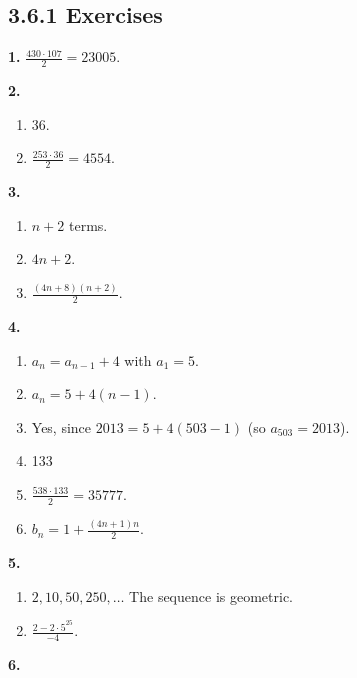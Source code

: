 \documentclass[10pt,]{book}
\theoremstyle{plain}
\theoremstyle{definition}
\theoremstyle{definition}
\theoremstyle{definition}
\numberwithin{equation}{chapter}
\begin{document}
\subsection*{3.6.1 Exercises}
\noindent\textbf{1.}\quad{}
            \(\frac{430\cdot 107}{2} = 23005\).
\par\smallskip
\noindent\textbf{2.}\quad{}\leavevmode%
\begin{enumerate}[label=(\alph*)]
\item\hypertarget{li-957}{}
                36.
\item\hypertarget{li-958}{}\(\frac{253 \cdot 36}{2} = 4554\).%
\end{enumerate}
\par\smallskip
\noindent\textbf{3.}\quad{}\leavevmode%
\begin{enumerate}[label=(\alph*)]
\item\hypertarget{li-962}{}\(n+2\) terms.%
\item\hypertarget{li-963}{}\(4n+2\).%
\item\hypertarget{li-964}{}\(\frac{(4n+8)(n+2)}{2}\).%
\end{enumerate}
\par\smallskip
\noindent\textbf{4.}\quad{}\leavevmode%
\begin{enumerate}[label=(\alph*)]
\item\hypertarget{li-971}{}\(a_n = a_{n-1} + 4\) with \(a_1 = 5\).%
\item\hypertarget{li-972}{}\(a_n = 5 + 4(n-1)\).%
\item\hypertarget{li-973}{}
                Yes, since \(2013 = 5 + 4(503-1)\) (so \(a_{503} = 2013\)).
\item\hypertarget{li-974}{}
                133
\item\hypertarget{li-975}{}\(\frac{538\cdot 133}{2} = 35777\).%
\item\hypertarget{li-976}{}\(b_n = 1 + \frac{(4n+1)n}{2}\).%
\end{enumerate}
\par\smallskip
\noindent\textbf{5.}\quad{}\leavevmode%
\begin{enumerate}[label=(\alph*)]
\item\hypertarget{li-979}{}\(2, 10, 50, 250, \ldots\) The sequence is geometric.%
\item\hypertarget{li-980}{}\(\frac{2 - 2\cdot 5^{25}}{-4}\).%
\end{enumerate}
\par\smallskip
\noindent\textbf{6.}\quad{}
\end{document}
